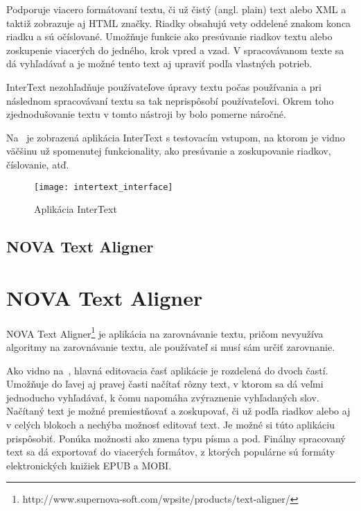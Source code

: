 Podporuje viacero formátovaní textu, či už čistý (angl. plain) text alebo XML a taktiž zobrazuje aj HTML značky. Riadky obsahujú vety oddelené znakom konca riadku a sú očíslované. Umožňuje funkcie ako presúvanie riadkov textu alebo zoskupenie viacerých do jedného, krok vpred a vzad. V spracovávanom texte sa dá vyhľadávať a je možné tento text aj upraviť podľa vlastných potrieb.

InterText nezohľadňuje používateľove úpravy textu počas používania a pri následnom spracovávaní textu sa tak neprispôsobí používateľovi. Okrem toho zjednodušovanie textu v tomto nástroji by bolo pomerne náročné.

Na~ je zobrazená aplikácia InterText s testovacím vstupom, na ktorom je vidno väčšinu už spomenutej funkcionality, ako presúvanie a zoskupovanie riadkov, číslovanie, atď.

\begin{figure}[H]
	\begin{center}\texttt{[image: intertext\_interface]}\end{center}
	\caption[Aplikácia InterText]{Aplikácia InterText}\label{fig:intertext_interface}
\end{figure}

%
%
{
	\subsection{NOVA Text Aligner}
}
{
	\section{NOVA Text Aligner}
}
NOVA Text Aligner\footnote{http://www.supernova-soft.com/wpsite/products/text-aligner/} je aplikácia na zarovnávanie textu, pričom nevyužíva algoritmy na zarovnávanie textu, ale používateľ si musí sám určiť zarovnanie.

Ako vidno na~, hlavná editovacia časť aplikácie je rozdelená do dvoch častí. Umožňuje do ľavej aj pravej časti načítať rôzny text, v ktorom sa dá veľmi jednoducho vyhľadávať, k čomu napomáha zvýraznenie vyhľadaných slov. Načítaný text je možné premiestňovať a zoskupovať, či už podľa riadkov alebo aj v celých blokoch a nechýba možnosť editovať text. Je možné si túto aplikáciu prispôsobiť. Ponúka možnosti ako zmena typu písma a pod. Finálny spracovaný text sa dá exportovať do viacerých formátov, z ktorých populárne sú formáty elektronických knižiek EPUB a MOBI.

